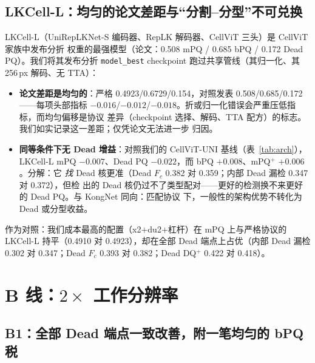 \documentclass[11pt]{article}
\begin{document}
\subsection{LKCell-L：均匀的论文差距与“分割--分型”不可兑换}
\label{sec:lkcell}

LKCell-L（UniRepLKNet-S 编码器、RepLK 解码器、CellViT 三头）是 CellViT 家族中发布分折
权重的最强模型（论文：0.508 mPQ / 0.685 bPQ / 0.172 Dead PQ）。我们将其发布分折
\texttt{model\_best} checkpoint 跑过共享管线（其归一化、其 256\,px 解码、无 TTA）：

\begin{itemize}
\item \textbf{论文差距是均匀的}：严格 0.4923/0.6729/0.154，对照发表 0.508/0.685/0.172
——每项头部指标 $-0.016$/$-0.012$/$-0.018$。折或归一化错误会严重压低指标，而均匀偏移是协议
差异（checkpoint 选择、解码、TTA 配方）的标志。我们如实记录这一差距；仅凭论文无法进一步
归因。
\item \textbf{同等条件下无 Dead 增益}：对照我们的 CellViT-UNI 基线（表~\ref{tab:arch}），
LKCell-L mPQ $-0.007$、Dead PQ $-0.022$，而 bPQ $+0.008$、mPQ$^+$ $+0.006$。分解：它
\emph{找} Dead 核更准（Dead $F_c$ 0.382 对 0.359；内部 Dead 漏检 0.347 对 0.372），但检
出的 Dead 核仍过不了类型配对——更好的检测换不来更好的 Dead PQ。与 KongNet 同向：匹配协议
下，一般性的架构优势不转化为 Dead 或分型收益。
\end{itemize}

作为对照：我们成本最高的配置（x2$+$du2$+$杠杆）在 mPQ 上与严格协议的 LKCell-L 持平（0.4910 对
0.4923），却在全部 Dead 端点上占优（内部 Dead 漏检 0.302 对 0.347；Dead $F_c$ 0.393 对
0.382；Dead DQ$^+$ 0.422 对 0.418）。

\section{B 线：$2\times$ 工作分辨率}
\label{sec:lineB}

\subsection{B1：全部 Dead 端点一致改善，附一笔均匀的 bPQ 税}
\label{sec:b1}
\end{document}
